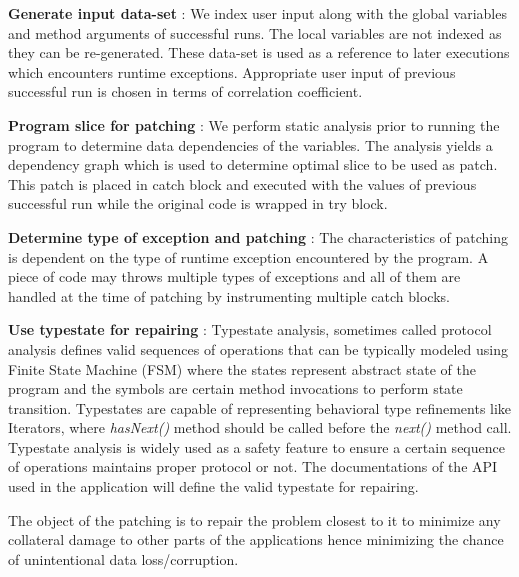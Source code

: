 \begin{mylist}
\item \textbf{Generate input data-set} : We index user input along with the
global variables and method arguments of successful runs.
The local variables are not indexed as they can be re-generated.
These data-set is used as a reference to later executions which encounters
runtime exceptions.
Appropriate user input of previous successful run is chosen in terms of
correlation coefficient.
	
\item \textbf{Program slice for patching} : We perform static analysis prior to
running the program to determine data dependencies of the variables.
The analysis yields a dependency graph which is used to determine optimal slice
to be used as patch.
This patch is placed in catch block and executed with the values of previous
successful run while the original code is wrapped in try block.
	
\item \textbf{Determine type of exception and patching} : The characteristics of
patching is dependent on the type of runtime exception encountered by the
program. A piece of code may throws multiple types of exceptions and all of them
are handled at the time of patching by instrumenting multiple catch blocks.
	
\item \textbf{Use typestate for repairing} : Typestate analysis, sometimes
called protocol analysis defines valid sequences of operations that can be
typically modeled using Finite State Machine (FSM) where the states represent
abstract state of the program and the symbols are certain method invocations to
perform state transition. Typestates are capable of representing behavioral type
refinements like Iterators, where \emph{hasNext()} method should be called
before the \emph{next()} method call.
Typestate analysis is widely used as a safety feature to ensure a certain
sequence of operations maintains proper protocol or not.
The documentations of the API used in the application will define the valid
typestate for repairing.
\end{mylist}

The object of the patching is to repair the problem closest to it to minimize
any collateral damage to other parts of the applications hence minimizing the
chance of unintentional data loss/corruption.

